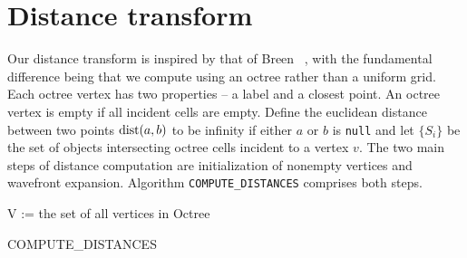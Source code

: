 \documentclass{egpubl}
\begin{document}
\section{Distance transform}
\label{sec:distance-transform}
Our distance transform is inspired by that of Breen \etal~, with the fundamental difference being that we compute using an octree rather than a uniform grid.  Each octree vertex has two properties -- a label and a closest point.
An octree vertex is empty if all incident cells are empty. Define the euclidean distance between two points $\text{dist}(a,b)$ to be infinity if either $a$ or $b$ is \texttt{null} and let $\{S_i\}$ be the set of objects intersecting octree cells incident to a vertex $v$. The two main steps of distance computation are initialization of nonempty vertices and wavefront expansion.  Algorithm \texttt{COMPUTE\_DISTANCES} comprises both steps.


\algorithmspace
\begin{algorithm}
  \DontPrintSemicolon
  \BlankLine
  V := the set of all vertices in Octree\;
\caption{COMPUTE\_DISTANCES}
\label{alg:compute-distances}
\end{algorithm}
\algorithmspace
\end{document}
